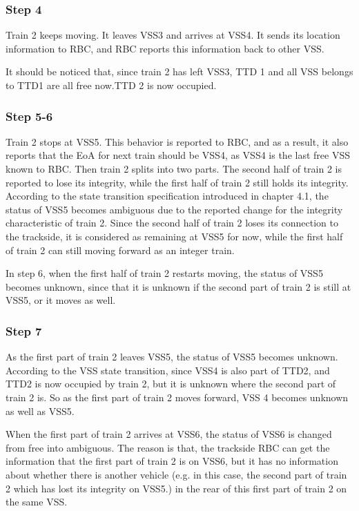 \documentclass[article,dr=phil,type=msc,colorback,accentcolor=tud9c]{tudthesis}
\begin{document}
    \subsubsection{Step 4}
    
    Train 2 keeps moving. It leaves VSS3 and arrives at VSS4. It sends its location information to RBC, and RBC reports this information back to other VSS.
    
    It should be noticed that, since train 2 has left VSS3, TTD 1 and all VSS belongs to TTD1 are all free now.TTD 2 is now occupied.

    \subsubsection{Step 5-6}

    Train 2 stops at VSS5. This behavior is reported to RBC, and as a result, it also reports that the EoA for next train should be VSS4, as VSS4 is the last free VSS known to RBC. Then train 2 splits into two parts. The second half of train 2 is reported to lose its integrity, while the first half of train 2 still holds its integrity. According to the state transition specification introduced in chapter 4.1, the status of VSS5 becomes ambiguous due to the reported change for the integrity characteristic of train 2. Since the second half of train 2 loses its connection to the trackside, it is considered as remaining at VSS5 for now, while the first half of train 2 can still moving forward as an integer train.
    
    In step 6, when the first half of train 2 restarts moving, the status of VSS5 becomes unknown, since that it is unknown if the second part of train 2 is still at VSS5, or it moves as well. 
    
	\subsubsection{Step 7}
	
    As the first part of train 2 leaves VSS5, the status of VSS5 becomes unknown. According to the VSS state transition, since VSS4 is also part of TTD2, and TTD2 is now occupied by train 2, but it is unknown where the second part of train 2 is. So as the first part of train 2 moves forward, VSS 4 becomes unknown as well as VSS5. 
    
    When the first part of train 2 arrives at VSS6, the status of VSS6 is changed from free into ambiguous. The reason is that, the trackside RBC can get the information that the first part of train 2 is on VSS6, but it has no information about whether there is another vehicle (e.g. in this case, the second part of train 2 which has lost its integrity on VSS5.) in the rear of this first part of train 2 on the same VSS.
    
\end{document}
